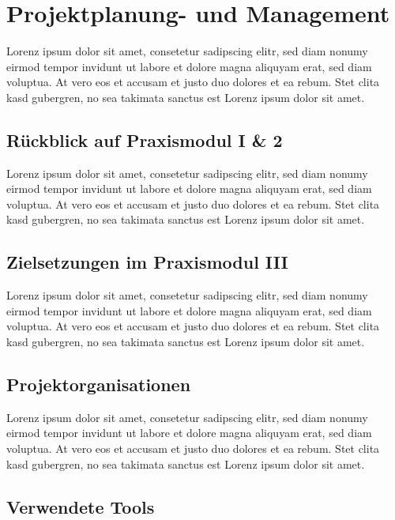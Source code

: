 \section{Projektplanung- und Management}\label{sec:section-one}

Lorenz ipsum dolor sit amet, consetetur sadipscing elitr, sed diam nonumy eirmod tempor invidunt ut labore et dolore magna aliquyam erat, sed diam voluptua.
At vero eos et accusam et justo duo dolores et ea rebum.
Stet clita kasd gubergren, no sea takimata sanctus est Lorenz ipsum dolor sit amet.

\subsection{Rückblick auf Praxismodul I \& 2}\label{subsec:subsection-one-one}

Lorenz ipsum dolor sit amet, consetetur sadipscing elitr, sed diam nonumy eirmod tempor invidunt ut labore et dolore magna aliquyam erat, sed diam voluptua.
At vero eos et accusam et justo duo dolores et ea rebum.
Stet clita kasd gubergren, no sea takimata sanctus est Lorenz ipsum dolor sit amet.

\newpage

\subsection{Zielsetzungen im Praxismodul III}\label{subsec:subsection-one-two}

Lorenz ipsum dolor sit amet, consetetur sadipscing elitr, sed diam nonumy eirmod tempor invidunt ut labore et dolore magna aliquyam erat, sed diam voluptua.
At vero eos et accusam et justo duo dolores et ea rebum.
Stet clita kasd gubergren, no sea takimata sanctus est Lorenz ipsum dolor sit amet.


\subsection{Projektorganisationen}\label{subsec:subsection-one-three}

Lorenz ipsum dolor sit amet, consetetur sadipscing elitr, sed diam nonumy eirmod tempor invidunt ut labore et dolore magna aliquyam erat, sed diam voluptua.
At vero eos et accusam et justo duo dolores et ea rebum.
Stet clita kasd gubergren, no sea takimata sanctus est Lorenz ipsum dolor sit amet.

\subsection{Verwendete Tools}\label{subsec:subsection-one-four}


